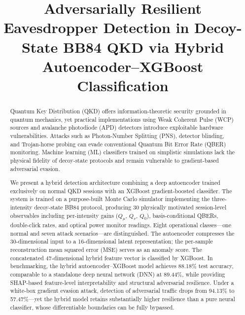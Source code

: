 \documentclass[conference]{IEEEtran}
\begin{document}
\title{Adversarially Resilient Eavesdropper Detection in Decoy-State BB84 QKD via Hybrid Autoencoder--XGBoost Classification}

\author{
}

\maketitle

\begin{abstract}
Quantum Key Distribution (QKD) offers information-theoretic security grounded in quantum mechanics, yet practical implementations using Weak Coherent Pulse (WCP) sources and avalanche photodiode (APD) detectors introduce exploitable hardware vulnerabilities. Attacks such as Photon-Number Splitting (PNS), detector blinding, and Trojan-horse probing can evade conventional Quantum Bit Error Rate (QBER) monitoring. Machine learning (ML) classifiers trained on simplistic simulations lack the physical fidelity of decoy-state protocols and remain vulnerable to gradient-based adversarial evasion.

We present a hybrid detection architecture combining a deep autoencoder trained exclusively on normal QKD sessions with an XGBoost gradient-boosted classifier. The system is trained on a purpose-built Monte Carlo simulator implementing the three-intensity decoy-state BB84 protocol, producing 30 physically motivated session-level observables including per-intensity gains ($Q_\mu$, $Q_\nu$, $Q_0$), basis-conditional QBERs, double-click rates, and optical power monitor readings. Eight operational classes---one normal and seven attack scenarios---are distinguished. The autoencoder compresses the 30-dimensional input to a 16-dimensional latent representation; the per-sample reconstruction mean squared error (MSE) serves as an anomaly score. The concatenated 47-dimensional hybrid feature vector is classified by XGBoost. In benchmarking, the hybrid autoencoder--XGBoost model achieves 88.18\% test accuracy, comparable to a standalone deep neural network (DNN) at 89.44\%, while providing SHAP-based feature-level interpretability and structural adversarial resilience. Under a white-box gradient evasion attack, detection of adversarial traffic drops from 94.13\% to 57.47\%---yet the hybrid model retains substantially higher resilience than a pure neural classifier, whose differentiable boundaries can be fully bypassed.
\end{abstract}
\end{document}
